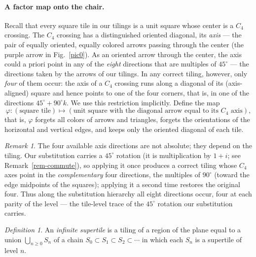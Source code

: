 \documentclass[11pt]{article}
\renewcommand{\ge}{\geqslant}
\theoremstyle{remark}
\newtheorem{definition}{Definition}
\newtheorem{remark}{Remark}
\begin{document}
\paragraph{A factor map onto the chair.}
Recall that every square tile in our tilings is a unit square whose center is a
$C_4$ crossing. The $C_4$ crossing has a distinguished oriented diagonal, its
\emph{axis} --- the pair of equally oriented, equally colored arrows passing
through the center (the purple arrow in Fig.~\ref{pic0}). As an oriented arrow
through the center, the axis could a priori point in any of the \emph{eight}
directions that are multiples of $45^\circ$ --- the directions taken by the
arrows of our tilings. In any correct tiling, however, only \emph{four} of them
occur: the axis of a $C_4$ crossing runs along a diagonal of its
(axis-aligned) square and hence points to one of the four corners, that is, in
one of the directions $45^\circ+90^\circ k$. We use this restriction
implicitly. Define the map
$$
\varphi : (\text{square tile}) \longmapsto (\text{unit square with the diagonal
arrow equal to its } C_4 \text{ axis}),
$$
that is, $\varphi$ forgets all colors of arrows and triangles, forgets the
orientations of the horizontal and vertical edges, and keeps only the oriented
diagonal of each tile.

\begin{remark}\label{rem-eight}
The four available axis directions are not absolute; they depend on the tiling.
Our substitution carries a $45^\circ$ rotation (it is multiplication by $1+i$;
see Remark~\ref{rem-commute}), so applying it once produces a correct
tiling whose $C_4$ axes point in the \emph{complementary} four directions, the
multiples of $90^\circ$ (toward the edge midpoints of the squares); applying it
a second time restores the original four. Thus along the substitution hierarchy
all eight directions occur, four at each parity of the level --- the tile-level
trace of the $45^\circ$ rotation our substitution carries.
\end{remark}

\begin{definition}\label{def-infsup}
An \emph{infinite supertile} is a tiling of a region of the plane equal to a
union $\bigcup_{n\ge 0} S_n$ of a chain $S_0\subset S_1\subset S_2\subset\cdots$
in which each $S_n$ is a supertile of level $n$.
\end{definition}
\end{document}
